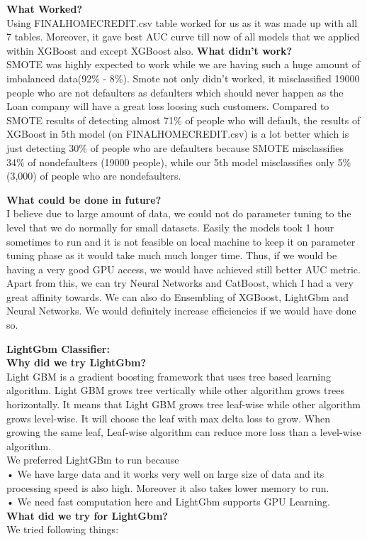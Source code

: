 \documentclass[fleqn,10pt]{SelfArx} %
\begin{document}
\begin{itemize}
\noindent
\textbf{What Worked?}\\
Using FINALHOMECREDIT.csv  table worked for us as it was made up with all 7 tables. Moreover, it gave best AUC curve till now of all models that we applied within XGBoost and except XGBoost also.
\bigbreak
\noindent
\textbf{What didn’t work?}\\
SMOTE was highly expected to work while we are having such a huge amount of imbalanced data(92\% - 8\%). Smote not only didn’t worked, it misclassified 19000 people who are not defaulters as defaulters which should never happen as the Loan company will have a great loss loosing such customers. Compared to SMOTE results of detecting almost 71\% of people who will default, the results of XGBoost in 5th model (on FINALHOMECREDIT.csv) is a lot better which is just detecting 30\% of people who are defaulters because SMOTE misclassifies 34\% of nondefaulters (19000 people), while our 5th model misclassifies only 5\%(3,000) of people who are nondefaulters. 


\bigbreak
\noindent
\textbf{What could be done in future?}\\
I believe due to large amount of data, we could not do parameter tuning to the level that we do normally for small datasets. Easily the models took 1 hour sometimes to run and it is not feasible on local machine to keep it on parameter tuning phase as it would take much much longer time. Thus, if we would be having a very good GPU access, we would have achieved still better AUC metric. \\
Apart from this, we can try Neural Networks and  CatBoost, which I had a very great affinity towards. We can also do Ensembling of XGBoost, LightGbm and Neural Networks. We would definitely increase efficiencies if we would have done so.

\bigbreak
\noindent
\textbf{LightGbm Classifier:} \\
\bigbreak
\noindent
\textbf{Why did we try LightGbm?}\\
\bigbreak
\noindent
Light GBM is a gradient boosting framework that uses tree based learning algorithm.
Light GBM grows tree vertically while other algorithm grows trees horizontally. It means that Light GBM grows tree leaf-wise while other algorithm grows level-wise. It will choose the leaf with max delta loss to grow. When growing the same leaf, Leaf-wise algorithm can reduce more loss than a level-wise algorithm.\\
We preferred LightGBm to run because \\
•	We have large data and it works very well on large size of data and its processing speed is also high. Moreover it also takes lower memory to run.  \\
•	We need fast computation here and LightGbm supports GPU Learning. \\
\bigbreak
\noindent
\textbf{What did we  try for LightGbm?}\\
\bigbreak
\noindent
We tried following things:\\


\end{itemize}
\end{document}
